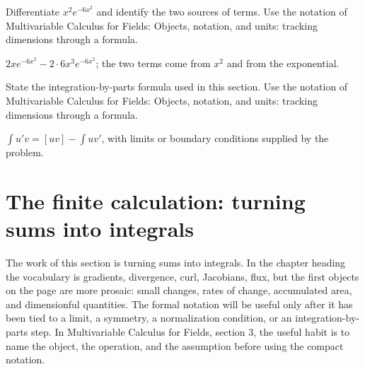 \begin{exercise}
Differentiate \(x^2e^{-6x^2}\) and identify the two sources of terms.  Use the notation of Multivariable Calculus for Fields: Objects, notation, and units: tracking dimensions through a formula.
\begin{answer}
\(2xe^{-6x^2}-2\cdot 6x^3e^{-6x^2}\); the two terms come from \(x^2\) and from the exponential.
\end{answer}
\end{exercise}

\begin{exercise}
State the integration-by-parts formula used in this section.  Use the notation of Multivariable Calculus for Fields: Objects, notation, and units: tracking dimensions through a formula.
\begin{answer}
\(\int u'v=[uv]-\int uv'\), with limits or boundary conditions supplied by the problem.
\end{answer}
\end{exercise}



\section{The finite calculation: turning sums into integrals}













The work of this section is turning sums into integrals.  In the chapter heading the vocabulary is gradients, divergence, curl, Jacobians, flux, but the first objects on the page are more prosaic: small changes, rates of change, accumulated area, and dimensionful quantities.  The formal notation will be useful only after it has been tied to a limit, a symmetry, a normalization condition, or an integration-by-parts step.  In Multivariable Calculus for Fields, section 3, the useful habit is to name the object, the operation, and the assumption before using the compact notation.

